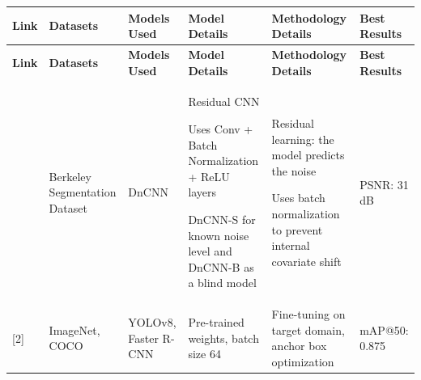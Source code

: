 \documentclass[a4paper, landscape]{article}
\begin{document}


\begin{xltabular}{\textwidth}{ R{8mm} R{30mm} Y Y Y Y }

\textbf{Link} &
\textbf{Datasets} &
\textbf{Models Used} &
\textbf{Model Details} &
\textbf{Methodology Details} &
\textbf{Best Results} \\

\hline\hline
\endfirsthead

\textbf{Link} &
\textbf{Datasets} &
\textbf{Models Used} &
\textbf{Model Details} &
\textbf{Methodology Details} &
\textbf{Best Results} \\
\hline\hline
\endhead


\cite{beyond_a_gaussian} & 
Berkeley Segmentation Dataset & 

DnCNN  & 

Residual CNN

Uses Conv + Batch Normalization + ReLU layers 

DnCNN-S for known noise level and DnCNN-B as a blind model & 

Residual learning: the model predicts the noise

Uses batch normalization to prevent internal covariate shift &

PSNR: 31 dB \\
\hline

[2] & ImageNet, COCO & YOLOv8, Faster R-CNN & Pre-trained weights, batch size 64 & Fine-tuning on target domain, anchor box optimization & mAP@50: 0.875 \\
\hline

\end{xltabular}





\end{document}
